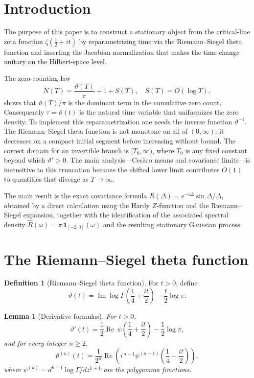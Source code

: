 \documentclass[11pt]{article}
\numberwithin{equation}{section}
\theoremstyle{plain}
\newtheorem{lemma}[theorem]{Lemma}
\theoremstyle{definition}
\newtheorem{definition}[theorem]{Definition}
\DeclareMathOperator{\Ree}{Re}
\DeclareMathOperator{\Imm}{Im}
\begin{document}
\tableofcontents

\section{Introduction}

The purpose of this paper is to construct a stationary object from the critical-line
zeta function \(\zeta(\tfrac12+it)\) by reparametrizing time via the Riemann--Siegel
theta function and inserting the Jacobian normalization that makes the time change
unitary on the Hilbert-space level.

The zero-counting law
\[
N(T)=\frac{\vartheta(T)}{\pi}+1+S(T),\quad S(T)=O(\log T),
\]
shows that \(\vartheta(T)/\pi\) is the dominant term in the cumulative zero count.
Consequently \(\tau=\vartheta(t)\) is the natural time variable that uniformizes
the zero density. To implement this reparametrization one needs the inverse function
\(\vartheta^{-1}\). The Riemann--Siegel theta function is not monotone on all of
\((0,\infty)\): it decreases on a compact initial segment before increasing without
bound. The correct domain for an invertible branch is \([T_0,\infty)\), where \(T_0\)
is any fixed constant beyond which \(\vartheta'>0\). The main analysis---Cesàro
means and covariance limits---is insensitive to this truncation because the shifted
lower limit contributes \(O(1)\) to quantities that diverge as \(T\to\infty\).

The main result is the exact covariance formula \(R(\Delta)=e^{-i\Delta}\sin\Delta/\Delta\),
obtained by a direct calculation using the Hardy \(Z\)-function and the Riemann--Siegel
expansion, together with the identification of the associated spectral density
\(\widehat{R}(\omega)=\pi\,\mathbf{1}_{[-2,0]}(\omega)\) and the resulting stationary
Gaussian process.

\section{The Riemann--Siegel theta function}

\begin{definition}[Riemann--Siegel theta function]
For \(t>0\), define
\begin{equation}
\vartheta(t)
=
\Imm\log\Gamma\!\left(\frac14+\frac{it}{2}\right)
-\frac{t}{2}\log\pi.
\label{eq:theta-def}
\end{equation}
\end{definition}

\begin{lemma}[Derivative formulas]
\label{lem:derivatives}
For \(t>0\),
\begin{equation}
\vartheta'(t)
=
\frac12
\Ree\,\psi\!\left(\frac14+\frac{it}{2}\right)
-\frac12\log\pi,
\label{eq:theta-prime}
\end{equation}
and for every integer \(n\ge2\),
\begin{equation}
\vartheta^{(n)}(t)
=
\frac{1}{2^n}
\Ree\!\left(
i^{\,n-1}\psi^{(n-1)}\!\left(\frac14+\frac{it}{2}\right)
\right),
\label{eq:theta-higher}
\end{equation}
where \(\psi^{(k)}=d^{k+1}\log\Gamma/dz^{k+1}\) are the polygamma functions.
\end{lemma}
\end{document}
